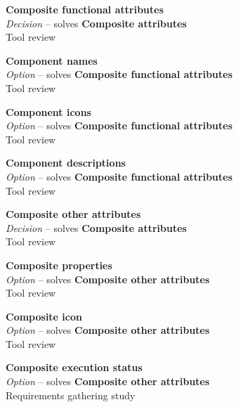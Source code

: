 \textbf{Composite functional attributes} \\ \emph{Decision} -- solves \textbf{Composite attributes} \\ Tool review

\textbf{Component names} \\ \emph{Option} -- solves \textbf{Composite functional attributes} \\ Tool review

\textbf{Component icons} \\ \emph{Option} -- solves \textbf{Composite functional attributes} \\ Tool review

\textbf{Component descriptions} \\ \emph{Option} -- solves \textbf{Composite functional attributes} \\ Tool review

\textbf{Composite other attributes} \\ \emph{Decision} -- solves \textbf{Composite attributes} \\ Tool review

\textbf{Composite properties} \\ \emph{Option} -- solves \textbf{Composite other attributes} \\ Tool review

\textbf{Composite icon} \\ \emph{Option} -- solves \textbf{Composite other attributes} \\ Tool review

\textbf{Composite execution status} \\ \emph{Option} -- solves \textbf{Composite other attributes} \\ Requirements gathering study
